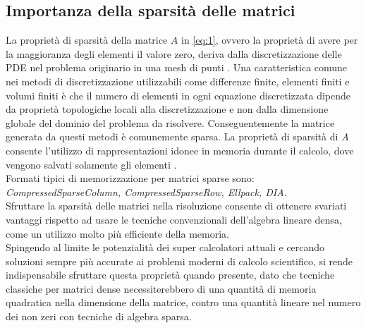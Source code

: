 \subsection{Importanza della sparsità delle matrici}
La proprietà di sparsità della matrice $A$ in \ref{eq:1}, ovvero la proprietà di avere per la maggioranza degli elementi il valore zero,
deriva dalla discretizzazione delle PDE nel problema originario in una mesh di punti \cite{sparseLinearSolverTR}.
Una caratteristica comune nei metodi di discretizzazione utilizzabili come differenze finite, elementi finiti e volumi finiti \cite{spMVfanf,pdeSparsfd1,pdeSparsfd2,pdeSparsfd3}
è che il numero di elementi in ogni equazione discretizzata dipende da proprietà topologiche locali alla discretizzazione
e non dalla dimensione globale del dominio del problema da risolvere. Conseguentemente la matrice generata da questi metodi è comunemente sparsa.
\voidLine
La proprietà di sparsità di $A$ consente l'utilizzo di rappresentazioni idonee in memoria durante il calcolo, 
dove vengono salvati solamente gli elementi \nnz.\\
Formati tipici di memorizzazione per matrici sparse sono: \emph{CompressedSparseColumn, CompressedSparseRow, Ellpack, DIA}.\\
\voidLine	%
Sfruttare la sparsità delle matrici nella risoluzione consente di ottenere svariati vantaggi
rispetto ad usare le tecniche convenzionali dell'algebra lineare densa, come un utilizzo molto più efficiente della memoria.\\
Spingendo al limite le potenzialità dei super calcolatori attuali e cercando soluzioni sempre più accurate ai problemi moderni di calcolo scientifico,
si rende indispensabile sfruttare questa proprietà quando presente,
dato che tecniche classiche per matrici dense necessiterebbero di una quantità di memoria 
quadratica nella dimensione della matrice, contro una quantità lineare nel numero dei non zeri con tecniche di algebra sparsa.
\voidLine	%
